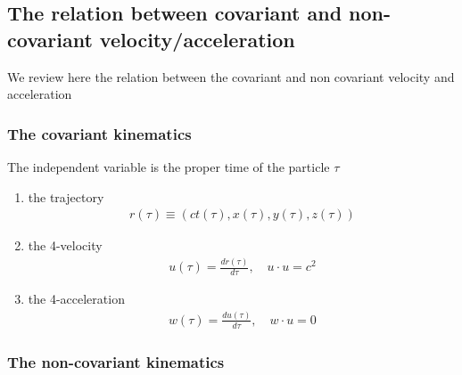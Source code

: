 \subsection{The relation between covariant and non-covariant velocity/acceleration}

We review here the relation between the covariant and non covariant velocity and acceleration
\subsubsection{The covariant kinematics}

The independent variable is the proper time of the particle $\tau$

\begin{enumerate}
  \item the trajectory
    \begin{align}
      r(\tau)\equiv (ct(\tau), x(\tau), y(\tau), z(\tau))
    \end{align}
  \item the 4-velocity
    \begin{align}
      u(\tau)=\frac{dr(\tau)}{d\tau},\quad u\cdot u = c^2
    \end{align}
  \item the 4-acceleration
    \begin{align}
      w(\tau)=\frac{du(\tau)}{d\tau}, \quad w\cdot u = 0
    \end{align}
\end{enumerate}

\subsubsection{The non-covariant kinematics}

